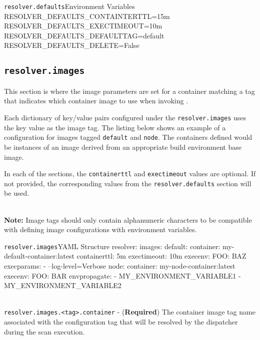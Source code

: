 \begin{code}{\texttt{resolver.defaults}}{Environment Variables}{}
RESOLVER_DEFAULTS_CONTAINTERTTL=15m
RESOLVER_DEFAULTS_EXECTIMEOUT=10m
RESOLVER_DEFAULTS_DEFAULTTAG=default
RESOLVER_DEFAULTS_DELETE=False
\end{code}

\subsection{\texttt{resolver.images}}

This section is where the image parameters are set for a container matching a tag that indicates 
which container image to use when invoking \scaresolver.

Each dictionary of key/value pairs configured under the \texttt{resolver.images} uses the key value 
as the image tag.  The listing below shows an example of a configuration for images 
tagged \texttt{default} and \texttt{node}.  The containers defined would be instances of 
an \scaresolver image derived from an appropriate build environment base image.

In each of the sections, the \texttt{containerttl} and \texttt{exectimeout} values are optional.  
If not provided, the corresponding values from the \texttt{resolver.defaults} section will be used.

\noindent\\\textbf{Note:} Image tags should only contain alphanumeric characters to be compatible with defining
image configurations with environment variables.\\


\begin{code}{\texttt{resolver.images}}{YAML Structure}{}
resolver:
    images:
        default:
            container: my-default-container:latest
            containerttl: 5m
            exectimeout: 10m
            execenv:
                FOO: BAZ
            execparams:
                - --log-level=Verbose
        node: 
            container: my-node-container:latest
            execenv:
                FOO: BAR
            envpropagate:
                - MY_ENVIRONMENT_VARIABLE1
                - MY_ENVIRONMENT_VARIABLE2
\end{code}



\noindent\\\texttt{resolver.images.<tag>.container} - (\textbf{Required}) The container image tag 
name associated with the configuration tag that will be resolved by the dispatcher
during the \cxflowplusplus scan execution.  

